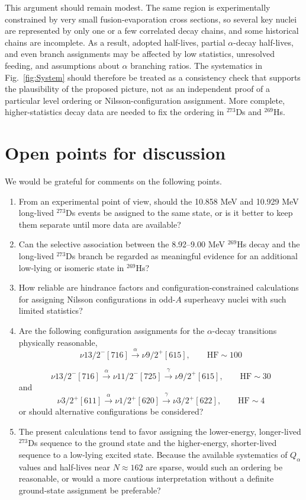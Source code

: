 \documentclass[11pt]{article}
\begin{document}
This argument should remain modest. The same region is experimentally constrained by very small fusion-evaporation cross sections, so several key nuclei are represented by only one or a few correlated decay chains, and some historical chains are incomplete. As a result, adopted half-lives, partial $\alpha$-decay half-lives, and even branch assignments may be affected by low statistics, unresolved feeding, and assumptions about $\alpha$ branching ratios. The systematics in Fig.~\ref{fig:System} should therefore be treated as a consistency check that supports the plausibility of the proposed picture, not as an independent proof of a particular level ordering or Nilsson-configuration assignment. More complete, higher-statistics decay data are needed to fix the ordering in $^{273}$Ds and $^{269}$Hs.

\section*{Open points for discussion}

We would be grateful for comments on the following points.

\begin{enumerate}
\item From an experimental point of view, should the 10.858 MeV and 10.929 MeV long-lived $^{273}$Ds events be assigned to the same state, or is it better to keep them separate until more data are available?
\item Can the selective association between the 8.92--9.00 MeV $^{269}$Hs decay and the long-lived $^{273}$Ds branch be regarded as meaningful evidence for an additional low-lying or isomeric state in $^{269}$Hs?
\item How reliable are hindrance factors and configuration-constrained calculations for assigning Nilsson configurations in odd-$A$ superheavy nuclei with such limited statistics?
\item Are the following configuration assignments for the $\alpha$-decay transitions physically reasonable,
\[
\nu 13/2^{-}[716]\xrightarrow{\alpha}\nu 9/2^{+}[615],\qquad \mathrm{HF}\sim 100
\]

\[
\nu 13/2^{-}[716]\xrightarrow{\alpha}\nu 11/2^{-}[725]\xrightarrow{\gamma}\nu 9/2^{+}[615],
\qquad \mathrm{HF}\sim 30
\]
and
$$
\nu 3/2^{+}[611]\xrightarrow{\alpha}\nu 1/2^{+}[620]\xrightarrow{\gamma}\nu 3/2^{+}[622],
\qquad \mathrm{HF}\sim 4
$$
or should alternative configurations be considered?
\item The present calculations tend to favor assigning the lower-energy, longer-lived $^{273}$Ds sequence to the ground state and the higher-energy, shorter-lived sequence to a low-lying excited state. Because the available systematics of $Q_{\alpha}$ values and half-lives near $N\approx 162$ are sparse, would such an ordering be reasonable, or would a more cautious interpretation without a definite ground-state assignment be preferable?
\end{enumerate}



\end{document}
